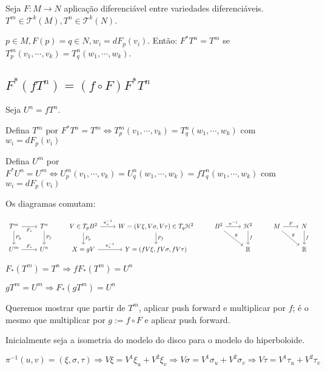 \documentclass[10pt,a4paper]{article}
\begin{document}
		Seja $F: M \rightarrow N$ aplica\c{c}\~ao diferenci\'avel entre variedades diferenci\'aveis.  $T^m \in \mathcal{T}^k(M), T^n \in \mathcal{T}^k(N)$.

		$p \in M, F(p) = q \in N, w_i = dF_p (v_i)$. Ent\~ao: $F^* T^n = T^m$ se $T^m_p (v_1, \cdots, v_k) = T_q^n (w_1, \cdots, w_k)$.

		\subsection{$F^* (fT^n) = (f \circ F) F^* T^n$}
		\begin{flushright}
		\end{flushright}

		Seja $U^n = f T^n$.

		Defina $T^m$ por $F^* T^n = T^m \Leftrightarrow T_p^m(v_1, \cdots, v_k) = T_q^n(w_1, \cdots, w_k)$ com $w_i = dF_p(v_i)$

		Defina $U^m$ por $F^* U^n = U^m \Leftrightarrow U_p^m(v_1, \cdots, v_k) = U_q^n(w_1, \cdots, w_k) = fT_q^n(w_1, \cdots, w_k)$ com $w_i = dF_p(v_i)$

		\vspace{3mm}

		Os diagramas comutam:

		\[
		\begin{tikzcd}
		T^m \arrow{d}{P_g} \arrow[swap]{r}{F_*} & T^n \arrow{d}{P_f} & V \in T_pB^2 \arrow{r}{\pi_*^{-1}} \arrow{d}{P_g} & W = (V\xi, V\sigma, V\tau) \in T_q{\mathcal{H}^2} \arrow{d}{P_f} & B^2 \arrow{r}{\pi^{-1}} \arrow{dr}{g} & \mathcal{H}^2 \arrow{d}{f} & M \arrow{r}{F} \arrow{dr}{g} & N \arrow{d}{f}   \\
		U^m \arrow{r}{F_*} & U^n & X = gV \arrow{r}{\pi_*^{-1}} &  Y = (fV\xi, fV\sigma, fV\tau) & & \mathbb{R} & & \mathbb{R}
		\end{tikzcd}
		\]

		$F_*(T^m) = T^n \Rightarrow f F_*(T^m) = U^n$

		$gT^m = U^m \Rightarrow F_*(g T^m) = U^n$

		Queremos mostrar que partir de $T^m$, aplicar push forward e multiplicar por $f$; \'e o mesmo que multiplicar por $g := f \circ F$ e aplicar push forward.

		Inicialmente seja a isometria do modelo do disco para o modelo do hiperboloide.

		$\pi^{-1}(u,v) = (\xi, \sigma, \tau) \Rightarrow V\xi = V^1 \xi_u + V^2 \xi_v \Rightarrow V\sigma = V^1 \sigma_u + V^2 \sigma_v \Rightarrow V\tau = V^1 \tau_u + V^2 \tau_v$
\end{document}
